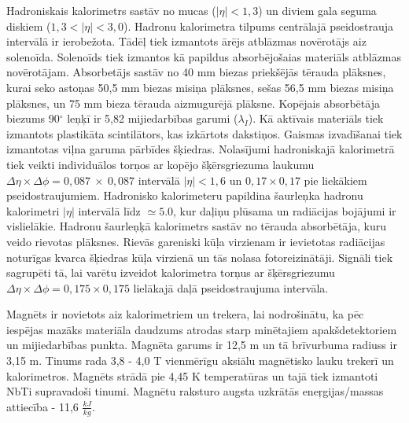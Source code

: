Hadroniskais kalorimetrs \cite{HCAL_report} sastāv no mucas ($\left|\eta\right|<1,3$) un diviem gala seguma diskiem ($1,3<\left|\eta\right|<3,0$). Hadronu kalorimetra tilpums centrālajā pseidostrauja intervālā ir ierobežota. Tādēļ tiek izmantots ārējs \gls{atblāzmas novērotājs} aiz solenoīda. Solenoīds tiek izmantos kā papildus absorbējošaias materiāls atblāzmas novērotājam. Absorbetājs sastāv no 40 mm biezas priekšējās tērauda plāksnes, kurai seko astoņas 50,5 mm biezas misiņa plāksnes, sešas 56,5 mm biezas misiņa plāksnes, un 75 mm bieza tērauda aizmugurējā plāksne. Kopējais absorbētāja biezums 90$^{\circ}$ leņķī ir 5,82 mijiedarbības garumi ($\lambda_{I}$). Kā aktīvais materiāls tiek izmantots plastikāta scintilātors, kas izkārtots \gls{dakstiņos}. Gaismas izvadīšanai tiek izmantotas viļna garuma pārbīdes šķiedras. Nolasījumi hadroniskajā kalorimetrā tiek veikti individuālos \gls{torņos} ar kopējo šķērsgriezuma laukumu $\Delta\eta\times\Delta\phi=0,087\ \times\ 0,087$ intervālā $\left|\eta\right|<1,6$ un $0,17\times0,17$ pie liekākiem pseidostraujumiem. Hadronisko kalorimeteru papildina šaurleņka hadronu kalorimetri $\left|\eta\right|$ intervālā līdz $\simeq5.0$, kur daļiņu plūsama un radiācijas bojājumi ir vislielākie. Hadronu šaurleņķā kalorimetrs sastāv no tērauda absorbētāja, kuru veido rievotas plāksnes. Rievās gareniski kūļa virzienam ir ievietotas radiācijas noturīgas kvarca šķiedras kūļa virzienā un tās nolasa fotoreizinātāji. Signāli tiek sagrupēti tā, lai varētu izveidot kalorimetra torņus ar šķērsgriezumu $\Delta\eta\times\Delta\phi=0,175\times0,175$ lielākajā daļā pseidostraujuma intervāla. 

Magnēts ir novietots aiz kalorimetriem un trekera, lai nodrošinātu, ka pēc iespējas mazāks materiāla daudzums atrodas starp minētajiem apakšdetektoriem un mijiedarbības punkta. Magnēta garums ir 12,5 m un tā brīvurbuma radiuss ir 3,15 m. Tinums rada 3,8 - 4,0 T vienmērīgu aksiālu magnētisko lauku trekerī un kalorimetros. Magnēts strādā pie 4,45 K temperatūras un tajā tiek izmantoti NbTi supravadoši tinumi. Magnētu raksturo augsta uzkrātās eneŗgijas/massas attiecība - 11,6 $\frac{kJ}{kg}$.

